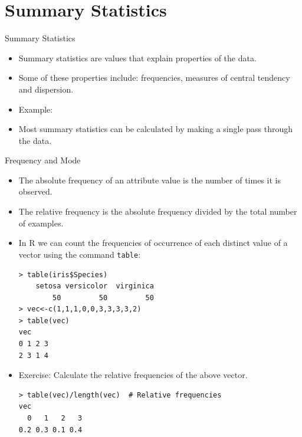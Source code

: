 \documentclass[handout]{beamer}
\begin{document}
\section{Summary Statistics}
\begin{frame}[fragile]{Summary Statistics}
\scriptsize{
\begin{itemize}
\item Summary statistics are values that explain properties of the data.
 \item Some of these properties include: frequencies, measures of central tendency and dispersion.
 \item Example: 
 
 \item Most summary statistics can be calculated by making a single pass through the data.

\end{itemize}



}
 
\end{frame}

\begin{frame}[fragile]{Frequency and Mode}
\scriptsize{
\begin{itemize}
 \item The absolute frequency of an attribute value is the number of times it is observed.
 \item The relative frequency is the absolute frequency divided by the total number of examples.
 \item In R we can count the frequencies of occurrence of each distinct value of a vector using the command \verb+table+: 
 \begin{verbatim}
> table(iris$Species)
    setosa versicolor  virginica 
        50         50         50  
> vec<-c(1,1,1,0,0,3,3,3,3,2)
> table(vec)
vec
0 1 2 3 
2 3 1 4 
 \end{verbatim} 
 \item Exercise: Calculate the relative frequencies of the above vector. 
 \begin{verbatim}
> table(vec)/length(vec)  # Relative frequencies
vec
  0   1   2   3 
0.2 0.3 0.1 0.4   
\end{verbatim}

 

\end{itemize}

 
 
} 
\end{frame}
\end{document}
